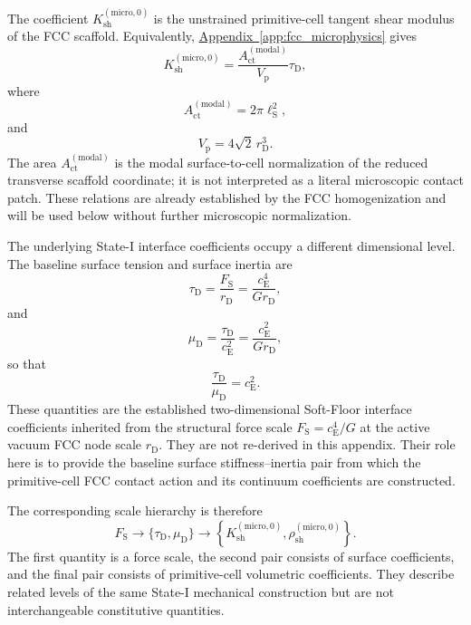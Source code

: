 The coefficient $K_{\mathrm{sh}}^{(\mathrm{micro},0)}$ is the unstrained primitive-cell tangent shear modulus of the FCC scaffold. Equivalently, \hyperref[app:fcc_microphysics]{Appendix~\ref*{app:fcc_microphysics}} gives
\begin{equation}
    K_{\mathrm{sh}}^{(\mathrm{micro},0)} = \frac{A_{\mathrm{ct}}^{(\mathrm{modal})}}{V_{\mathrm{p}}} \tau_{\mathrm{D}},
\end{equation}
where
\begin{equation}
    A_{\mathrm{ct}}^{(\mathrm{modal})} = 2\pi\ell_{\mathrm{S}}^{2},
\end{equation}
and
\begin{equation}
    V_{\mathrm{p}} = 4\sqrt{2}\,r_{\mathrm{D}}^{3}.
\end{equation}
The area $A_{\mathrm{ct}}^{(\mathrm{modal})}$ is the modal surface-to-cell normalization of the reduced transverse scaffold coordinate; it is not interpreted as a literal microscopic contact patch. These relations are already established by the FCC homogenization and will be used below without further microscopic normalization.

The underlying State-I interface coefficients occupy a different dimensional level. The baseline surface tension and surface inertia are
\begin{equation}
    \tau_{\mathrm{D}} = \frac{F_{\mathrm{S}}}{r_{\mathrm{D}}} = \frac{c_{\mathrm{E}}^{4}}{G r_{\mathrm{D}}},
\end{equation}
and
\begin{equation}
    \mu_{\mathrm{D}} = \frac{\tau_{\mathrm{D}}}{c_{\mathrm{E}}^{2}} = \frac{c_{\mathrm{E}}^{2}}{G r_{\mathrm{D}}},
\end{equation}
so that
\begin{equation}
    \frac{\tau_{\mathrm{D}}}{\mu_{\mathrm{D}}} = c_{\mathrm{E}}^{2}.
\end{equation}
These quantities are the established two-dimensional Soft-Floor interface coefficients inherited from the structural force scale $F_{\mathrm{S}}=c_{\mathrm{E}}^{4}/G$ at the active vacuum FCC node scale $r_{\mathrm{D}}$. They are not re-derived in this appendix. Their role here is to provide the baseline surface stiffness–inertia pair from which the primitive-cell FCC contact action and its continuum coefficients are constructed.

The corresponding scale hierarchy is therefore
\begin{equation}
    F_{\mathrm{S}} \longrightarrow \{\tau_{\mathrm{D}}, \mu_{\mathrm{D}}\} \longrightarrow \left\{ K_{\mathrm{sh}}^{(\mathrm{micro},0)}, \rho_{\mathrm{sh}}^{(\mathrm{micro},0)} \right\}.
\end{equation}
The first quantity is a force scale, the second pair consists of surface coefficients, and the final pair consists of primitive-cell volumetric coefficients. They describe related levels of the same State-I mechanical construction but are not interchangeable constitutive quantities.

